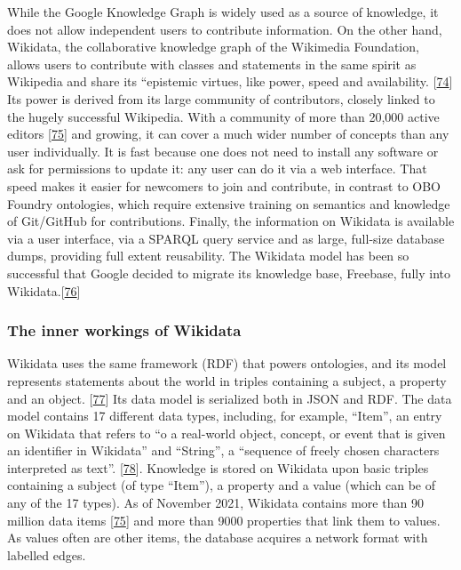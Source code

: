 While the Google Knowledge Graph is widely used as a source of knowledge, it does not allow independent users to contribute information.
On the other hand, Wikidata, the collaborative knowledge graph of the Wikimedia Foundation, allows users to contribute with classes and statements in the same spirit as Wikipedia and share its ``epistemic virtues, like power, speed and availability. {[}\protect\hyperlink{ref-qMozvNth}{74}{]}
Its power is derived from its large community of contributors, closely linked to the hugely successful Wikipedia.
With a community of more than 20,000 active editors {[}\protect\hyperlink{ref-SGzjBOG0}{75}{]} and growing, it can cover a much wider number of concepts than any user individually.
It is fast because one does not need to install any software or ask for permissions to update it: any user can do it via a web interface.
That speed makes it easier for newcomers to join and contribute, in contrast to OBO Foundry ontologies, which require extensive training on semantics and knowledge of Git/GitHub for contributions.
Finally, the information on Wikidata is available via a user interface, via a SPARQL query service and as large, full-size database dumps, providing full extent reusability.
The Wikidata model has been so successful that Google decided to migrate its knowledge base, Freebase, fully into Wikidata.{[}\protect\hyperlink{ref-xLpRePoh}{76}{]}

\hypertarget{the-inner-workings-of-wikidata}{%
\subsubsection{The inner workings of Wikidata}\label{the-inner-workings-of-wikidata}}

Wikidata uses the same framework (RDF) that powers ontologies, and its model represents statements about the world in triples containing a subject, a property and an object. {[}\protect\hyperlink{ref-Ea6hVYrD}{77}{]}
Its data model is serialized both in JSON and RDF.
The data model contains 17 different data types, including, for example, ``Item'', an entry on Wikidata that refers to ``o a real-world object, concept, or event that is given an identifier in Wikidata'' and ``String'', a ``sequence of freely chosen characters interpreted as text''. {[}\protect\hyperlink{ref-17Yt10yrY}{78}{]}.
Knowledge is stored on Wikidata upon basic triples containing a subject (of type ``Item''), a property and a value (which can be of any of the 17 types).
As of November 2021, Wikidata contains more than 90 million data items {[}\protect\hyperlink{ref-SGzjBOG0}{75}{]} and more than 9000 properties that link them to values.
As values often are other items, the database acquires a network format with labelled edges.

